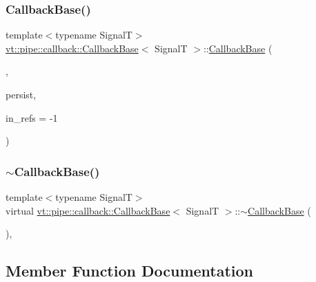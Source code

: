 \subsubsection{\texorpdfstring{Callback\+Base()}{CallbackBase()}\hspace{0.1cm}{\footnotesize\ttfamily [7/7]}}
{\footnotesize\ttfamily template$<$typename SignalT$>$ \\
\hyperlink{structvt_1_1pipe_1_1callback_1_1_callback_base}{vt\+::pipe\+::callback\+::\+Callback\+Base}$<$ SignalT $>$\+::\hyperlink{structvt_1_1pipe_1_1callback_1_1_callback_base}{Callback\+Base} (\begin{DoxyParamCaption}\item[{Callback\+Explicit\+Tag\+Type}]{,  }\item[{bool const \&}]{persist,  }\item[{\hyperlink{namespacevt_a9b39ce9494bb04674d0d5b895a5aa50f}{Ref\+Type} const \&}]{in\+\_\+refs = {\ttfamily -\/1} }\end{DoxyParamCaption})\hspace{0.3cm}{\ttfamily [inline]}}

\mbox{\label{structvt_1_1pipe_1_1callback_1_1_callback_base_adc39148be97af3105f9b5765431bdc9a}} 
\subsubsection{\texorpdfstring{$\sim$\+Callback\+Base()}{~CallbackBase()}}
{\footnotesize\ttfamily template$<$typename SignalT$>$ \\
virtual \hyperlink{structvt_1_1pipe_1_1callback_1_1_callback_base}{vt\+::pipe\+::callback\+::\+Callback\+Base}$<$ SignalT $>$\+::$\sim$\hyperlink{structvt_1_1pipe_1_1callback_1_1_callback_base}{Callback\+Base} (\begin{DoxyParamCaption}{ }\end{DoxyParamCaption})\hspace{0.3cm}{\ttfamily [virtual]}, {\ttfamily [default]}}



\subsection{Member Function Documentation}
\mbox{\label{structvt_1_1pipe_1_1callback_1_1_callback_base_a9ef1595197b291a660e6d19aadb0203e}} 
